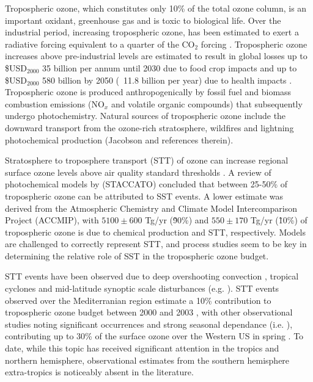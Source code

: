 \documentclass{article}
\begin{document}
    Tropospheric ozone, which constitutes only 10\% of the total ozone column, is an important oxidant, greenhouse gas and is toxic to biological life. 
    Over the industrial period, increasing tropospheric ozone, has been estimated to exert a radiative forcing equivalent to a quarter of the CO$_2$ forcing \citep{IPCC_Chapter2}. Tropospheric ozone increases above pre-industrial levels are estimated to result in global losses up to \$USD$_{2000}$ 35 billion per annum until 2030 due to food crop impacts \citep{Avnery2011} and up to \$USD$_{2000}$ 580 billion by 2050 (~11.8 billion per year) due to health impacts \citep{Selin2009}. Tropospheric ozone is produced anthropogenically by fossil fuel and biomass combustion emissions (NO$_x$ and volatile organic compounds) that subsequently undergo photochemistry. Natural sources of tropospheric ozone include the downward transport from the ozone-rich stratosphere, wildfires and lightning photochemical production (\citet{Jacobsonsxxxx}Jacobson and references therein). 
 
    Stratosphere to troposphere transport (STT) of ozone can increase regional surface ozone levels above air quality standard thresholds \citep{Danielson1968, Lefohn2011, Langford2012, Zhang2014}. A review of photochemical models by \citet{Stohl2003} (STACCATO) concluded that between 25-50\% of tropospheric ozone can be attributed to SST events. A lower estimate was derived from the Atmospheric Chemistry and Climate Model Intercomparison Project (ACCMIP), \citet{Stevenson2006} with $5100\pm600$ Tg/yr (\~90\%) and $550\pm170$ Tg/yr (\~10\%) of tropospheric ozone is due to chemical production and STT, respectively. Models are challenged to correctly represent STT, and process studies seem to be key in determining the relative role of SST in the tropospheric ozone budget.
    
    STT events have been observed due to deep overshooting convection \citep{Frey2015}, tropical cyclones \citep{Das2016} and mid-latitude synoptic scale disturbances (e.g. \citet{Stohl2003,Mihalikova2012}). STT events observed over the Mediterranian region estimate a 10\% contribution to tropospheric ozone budget between 2000 and 2003 \citep{Galani2003}, with other observational studies noting significant occurrences and strong seasonal dependance (i.e. \citet{Lefohn2011}), contributing up to 30\% of the surface ozone over the Western US in spring \citep{Lin2012}. To date, while this topic has received significant attention in the tropics and northern hemisphere, observational estimates from the southern hemisphere extra-tropics is noticeably absent in the literature. 
    
\end{document}
